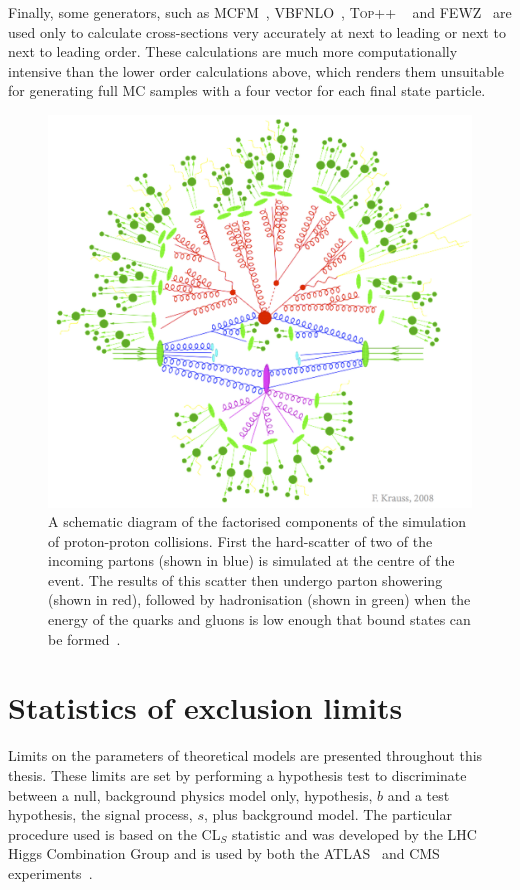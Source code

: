 Finally, some generators, such as MCFM~\cite{PhysRevD.68.094021}, VBFNLO~\cite{Baglio:2014uba,Arnold:2011wj,Arnold20091661}, \textsc{Top++} ~\cite{Czakon20142930} and \textsc{FEWZ}~\cite{PhysRevD.86.094034} are used only to calculate cross-sections very accurately at next to leading or next to next to leading order. These calculations are much more computationally intensive than the lower order calculations above, which renders them unsuitable for generating full \ac{MC} samples with a four vector for each final state particle.

\begin{figure}
  \includegraphics[width=\largefigwidth]{plots/theory/factorisation.png}
  \caption{A schematic diagram of the factorised components of the simulation of proton-proton collisions. First the hard-scatter of two of the incoming partons (shown in blue) is simulated at the centre of the event. The results of this scatter then undergo parton showering (shown in red), followed by hadronisation (shown in green) when the energy of the quarks and gluons is low enough that bound states can be formed~\cite{krauss-diag}.}
  \label{fig:factorisation}
\end{figure}

\section{Statistics of exclusion limits}
\label{sec:stats}
Limits on the parameters of theoretical models are presented throughout this thesis. These limits are set by performing a hypothesis test to discriminate between a null, background physics model only, hypothesis, $b$ and a test hypothesis, the signal process, $s$, plus background model. The particular procedure used is based on the CL$_{S}$ statistic and was developed by the LHC Higgs Combination Group and is used by both the ATLAS~\cite{Aad:1129811} and CMS experiments~\cite{ATL-PHYS-PUB-2011-011}. 

